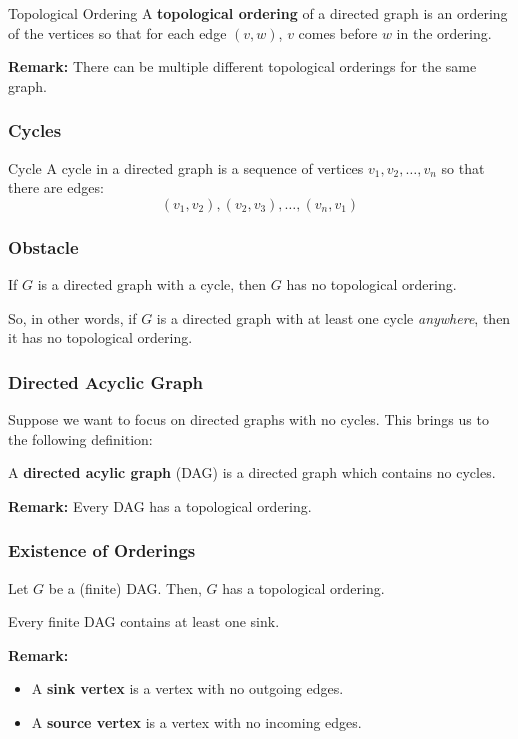 \documentclass[letterpaper]{article}
\begin{document}
\begin{definition}{Topological Ordering}{}
    A \textbf{topological ordering} of a directed graph is an ordering of the vertices so that for each edge $(v, w)$, $v$ comes before $w$ in the ordering.
\end{definition}
\textbf{Remark:} There can be multiple different topological orderings for the same graph.

\subsubsection{Cycles}
\begin{definition}{Cycle}{}
    A cycle in a directed graph is a sequence of vertices $v_1, v_2, \dots, v_n$ so that there are edges: 
    \[(v_1, v_2), (v_2, v_3), \dots, (v_n, v_1)\]
\end{definition}

\subsubsection{Obstacle}
\begin{proposition}
    If $G$ is a directed graph with a cycle, then $G$ has no topological ordering.
\end{proposition}
So, in other words, if $G$ is a directed graph with at least one cycle \emph{anywhere}, then it has no topological ordering.

\subsubsection{Directed Acyclic Graph}
Suppose we want to focus on directed graphs with no cycles. This brings us to the following definition:
\begin{definition}{}{}
    A \textbf{directed acylic graph} (DAG) is a directed graph which contains no cycles. 
\end{definition}
\textbf{Remark:} Every DAG has a topological ordering. 

\subsubsection{Existence of Orderings}
\begin{theorem}{}{}
    Let $G$ be a (finite) DAG. Then, $G$ has a topological ordering.
\end{theorem}

\begin{lemma}{}{}
    Every finite DAG contains at least one sink. 
\end{lemma}
\textbf{Remark:}
\begin{itemize}
    \item A \textbf{sink vertex} is a vertex with no outgoing edges.
    \item A \textbf{source vertex} is a vertex with no incoming edges.
\end{itemize}
\end{document}
